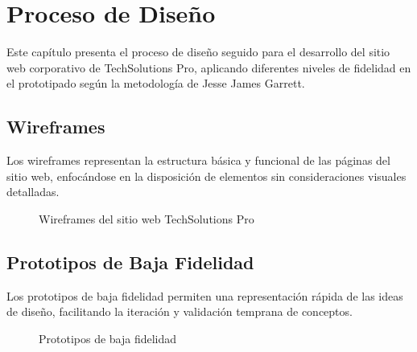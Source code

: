 \chapter{Proceso de Diseño}

Este capítulo presenta el proceso de diseño seguido para el desarrollo del sitio web corporativo de TechSolutions Pro, aplicando diferentes niveles de fidelidad en el prototipado según la metodología de Jesse James Garrett.

\section{Wireframes}

Los wireframes representan la estructura básica y funcional de las páginas del sitio web, enfocándose en la disposición de elementos sin consideraciones visuales detalladas.

\begin{figure}[htbp]
\centering
{}
\caption{Wireframes del sitio web TechSolutions Pro}
\label{fig:wireframes}
\end{figure}

\section{Prototipos de Baja Fidelidad}

Los prototipos de baja fidelidad permiten una representación rápida de las ideas de diseño, facilitando la iteración y validación temprana de conceptos.

\begin{figure}[htbp]
\centering
{}
\caption{Prototipos de baja fidelidad}
\label{fig:low-fidelity}
\end{figure}

